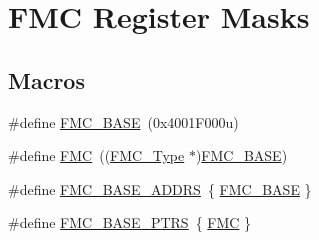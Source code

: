 \hypertarget{group___f_m_c___register___masks}{}\section{F\+MC Register Masks}
\label{group___f_m_c___register___masks}
\subsection*{Macros}
\begin{DoxyCompactItemize}
\item 
\#define \mbox{\hyperlink{group___f_m_c___register___masks_ga68a39e11ba4a19785d20a98954c7fc9e}{F\+M\+C\+\_\+\+B\+A\+SE}}~(0x4001\+F000u)
\item 
\#define \mbox{\hyperlink{group___f_m_c___register___masks_ga970254e6dadedc433f57d43709636664}{F\+MC}}~((\mbox{\hyperlink{struct_f_m_c___type}{F\+M\+C\+\_\+\+Type}} $\ast$)\mbox{\hyperlink{group___f_m_c___register___masks_ga68a39e11ba4a19785d20a98954c7fc9e}{F\+M\+C\+\_\+\+B\+A\+SE}})
\item 
\#define \mbox{\hyperlink{group___f_m_c___register___masks_ga37283f414971381846ab9da2c77096b3}{F\+M\+C\+\_\+\+B\+A\+S\+E\+\_\+\+A\+D\+D\+RS}}~\{ \mbox{\hyperlink{group___f_m_c___register___masks_ga68a39e11ba4a19785d20a98954c7fc9e}{F\+M\+C\+\_\+\+B\+A\+SE}} \}
\item 
\#define \mbox{\hyperlink{group___f_m_c___register___masks_ga7ad26eb02eedda3bb7e2863700c32017}{F\+M\+C\+\_\+\+B\+A\+S\+E\+\_\+\+P\+T\+RS}}~\{ \mbox{\hyperlink{group___f_m_c___register___masks_ga970254e6dadedc433f57d43709636664}{F\+MC}} \}
\end{DoxyCompactItemize}
